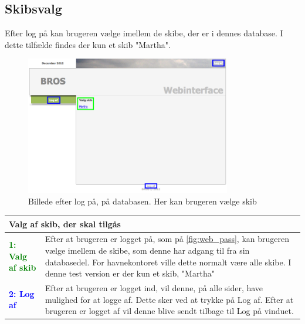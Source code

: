 \subsection*{Skibsvalg}
Efter log på kan brugeren vælge imellem de skibe, der er i dennes database. I dette tilfælde findes der kun et skib "Martha".
\begin{figure}[H]
	\centering
	\includegraphics[width=0.8\textwidth]{billeder/database/web_ship_choice}
	\caption{Billede efter log på, på databasen. Her kan brugeren vælge skib}
	\label{fig:web_ship_choice}
\end{figure}

\begin{table}[H]
\begin{tabular}{l p{12.5cm}}
\multicolumn{2}{l}{Valg af skib, der skal tilgås } \\
\hline
\textcolor{green}{\textbf{1: Valg af skib}}
&Efter at brugeren er logget på, som på \ref{fig:web_pass}, kan brugeren vælge imellem de skibe, som denne har adgang til fra sin databasedel. For havnekontoret ville dette normalt være alle skibe. I denne test version er der kun et skib, "Martha"\\
\textcolor{blue}{\textbf{2: Log af}}
&Efter at brugeren er logget ind, vil denne, på alle sider, have mulighed for at logge af. Dette sker ved at trykke på Log af. Efter at brugeren er logget af vil denne blive sendt tilbage til Log på vinduet.\\
\end{tabular}
\end{table}

